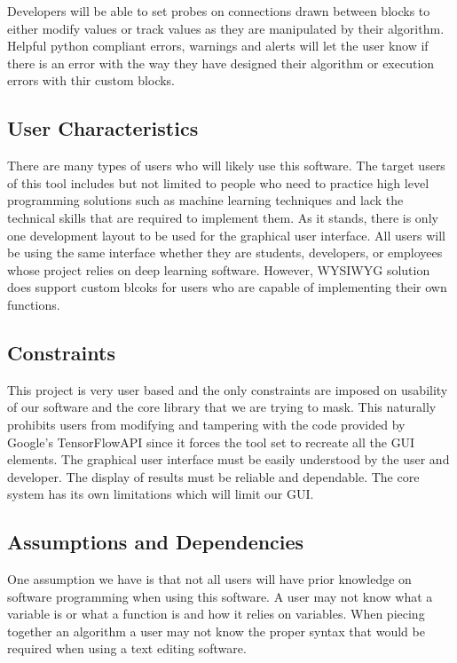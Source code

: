 \documentclass[journal,10pt,onecolumn,compsoc]{IEEEtran} \usepackage[margin=1.0in]{geometry} \usepackage{pdfpages} \usepackage{graphicx}
\begin{document}
Developers will be able to set probes on connections drawn between blocks to either modify values or track values as they are manipulated by their algorithm.
Helpful python compliant errors, warnings and alerts will let the user know if there is an error with the way they have designed their algorithm or execution errors with thir custom blocks.

\subsection{User Characteristics}

There are many types of users who will likely use this software. 
The target users of this tool includes but not limited to people who need to practice high level programming solutions such as machine learning techniques and lack the technical skills that are required to implement them.
As it stands, there is only one development layout to be used for the graphical user interface.
All users will be using the same interface whether they are students, developers, or employees whose project relies on deep learning software. 
However, WYSIWYG solution does support custom blcoks for users who are capable of implementing their own functions.

\subsection{Constraints}

This project is very user based and the only constraints are imposed on usability of our software and the core library that we are trying to mask. 
This naturally prohibits users from modifying and tampering with the code provided by Google's TensorFlow\texttrademark API since it forces the tool set to recreate all the GUI elements.
The graphical user interface must be easily understood by the user and developer.
The display of results must be reliable and dependable.
The core system has its own limitations which will limit our GUI.

\subsection{Assumptions and Dependencies}

One assumption we have is that not all users will have prior knowledge on software programming when using this software.
A user may not know what a variable is or what a function is and how it relies on variables. 
When piecing together an algorithm a user may not know the proper syntax that would be required when using a text editing software.
\end{document}

